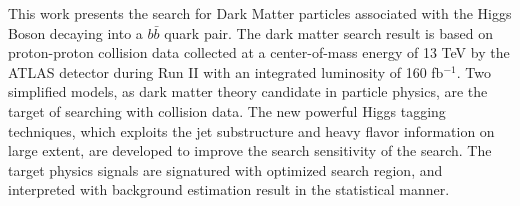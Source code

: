 This work presents the search for Dark Matter particles associated with the Higgs Boson decaying into a $b\bar{b}$ quark pair. 
The dark matter search result is based on proton-proton collision data collected at a center-of-mass energy of 13 TeV by the ATLAS detector during Run II with an integrated luminosity of 160 fb$^{-1}$. 
Two simplified models, as dark matter theory candidate in particle physics, are the target of searching with collision data. 
The new powerful Higgs tagging techniques, which exploits the jet substructure and heavy flavor information on large extent, are developed to improve the search sensitivity of the search. 
The target physics signals are signatured with optimized search region, and interpreted with background estimation result in the statistical manner.
